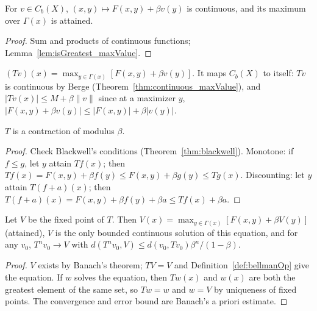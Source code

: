 \begin{lemma}
\label{lem:dp_objective}
\leanok
{}
For $v \in C_b(X)$, $(x, y) \mapsto F(x, y) + \beta v(y)$ is continuous, and its maximum over $\Gamma(x)$
is attained.
\end{lemma}
\begin{proof}
\leanok
Sum and products of continuous functions; Lemma~\ref{lem:isGreatest_maxValue}.
\end{proof}

\begin{definition}
\label{def:bellmanOp}
\leanok
{}
$(Tv)(x) = \max_{y \in \Gamma(x)} [F(x, y) + \beta v(y)]$. It maps $C_b(X)$ to itself: $Tv$ is continuous
by Berge (Theorem~\ref{thm:continuous_maxValue}), and $|Tv(x)| \le M + \beta \|v\|$ since at a maximizer
$y$, $|F(x, y) + \beta v(y)| \le |F(x, y)| + \beta |v(y)|$.
\end{definition}

\begin{theorem}
\label{thm:bellman_contracting}
\leanok
{}
$T$ is a contraction of modulus $\beta$.
\end{theorem}
\begin{proof}
\leanok
Check Blackwell's conditions (Theorem~\ref{thm:blackwell}).
Monotone: if $f \le g$, let $y$ attain $Tf(x)$; then
$Tf(x) = F(x, y) + \beta f(y) \le F(x, y) + \beta g(y) \le Tg(x)$.
Discounting: let $y$ attain $T(f + a)(x)$; then
$T(f + a)(x) = F(x, y) + \beta f(y) + \beta a \le Tf(x) + \beta a$.
\end{proof}

\begin{theorem}
\label{thm:bellman_equation}
\leanok
{}
Let $V$ be the fixed point of $T$. Then $V(x) = \max_{y \in \Gamma(x)} [F(x, y) + \beta V(y)]$ (attained),
$V$ is the only bounded continuous solution of this equation, and for any $v_0$,
$T^n v_0 \to V$ with $d(T^n v_0, V) \le d(v_0, T v_0) \beta^n / (1 - \beta)$.
\end{theorem}
\begin{proof}
\leanok
$V$ exists by Banach's theorem; $TV = V$ and Definition~\ref{def:bellmanOp} give the equation. If $w$
solves the equation, then $Tw(x)$ and $w(x)$ are both the greatest element of the same set, so $Tw = w$
and $w = V$ by uniqueness of fixed points. The convergence and error bound are Banach's a priori estimate.
\end{proof}


